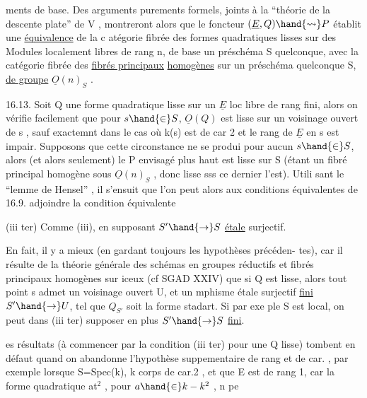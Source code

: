 
ments de base. Des arguments purements formels, joints à la
``théorie de la descente plate'' de  V  , montreront alors que le foncteur
$(\underline{E},Q) \hand{\rightsquigarrow} P$ établit une \uline{équivalence} de la c atégorie fibrée des formes
quadratiques lisses sur des Modules localement libres de rang n, de base
un préschéma S quelconque, avec la catégorie fibrée des \uline{fibrés principaux}
\uline{homogènes} sur un préschéma quelconque S, \uline{de groupe} $\underline{O}(n)_S$ .

16.13. Soit Q une forme quadratique lisse sur un $\underline{E}$ loc libre de
rang fini, alors on vérifie facilement que pour $s \hand{\in} S$, $\underline{O}(Q)$ est lisse
sur un voisinage ouvert de s ,  sauf exactemnt dans
le cas où k(s) est de car 2 et le rang de $\underline{E}$ en s est impair. Supposons
que cette circonstance ne se produi pour aucun $s \hand{\in} S$, alors (et alors
seulement) le P envisagé plus haut est lisse sur S (étant un fibré
principal homogène sous $\underline{O}(n)_S$ , donc lisse sss ce dernier l'est). Utili
sant le ``lemme de Hensel'' , il s'ensuit que  l'on peut alors aux
conditions équivalentes de 16.9. adjoindre la condition  équivalente

(iii ter)  Comme (iii), en supposant $S' \hand{\to} S$
\uline{étale} surjectif.

En fait, il y a mieux (en gardant toujours les hypothèses précéden-%
tes), car il résulte de la théorie générale des schémas en groupes réductifs
et fibrés principaux homogènes sur iceux (cf SGAD XXIV) que  si Q est
lisse, alors tout point s admet un voisinage ouvert U, et un mphisme
étale surjectif \uline{fini} $S' \hand{\to} U$, tel que $Q_{S'}$ soit la forme stadart. Si par exe
ple S est local, on peut dans (iii ter) supposer en plus $S' \hand{\to} S$ \uline{fini}.

 es résultats  (à commencer par la condition (iii ter) pour une Q
lisse)\hand{,} tombent en défaut quand on abandonne l'hypothèse suppementaire
de rang et de car. , par exemple lorsque S=Spec(k), k corps  de car.2 , et
que E est de rang 1, car la forme quadratique at$^{2}$ , pour $a\hand{\in} k - k^{2}$ , n pe

